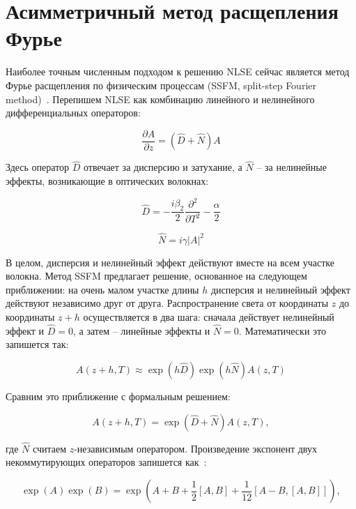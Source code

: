 \section{Асимметричный метод расщепления Фурье}

Наиболее точным численным подходом к решению NLSE сейчас является метод Фурье расщепления по физическим процессам (SSFM, split-step Fourier method)~\cite{ARORA2022169661, agrawal2007nonlinear}.
Перепишем NLSE как комбинацию линейного и нелинейного дифференциальных операторов:

\begin{equation}
	\frac{\partial A}{\partial z} = (\hat{D} + \hat{N}) A
\end{equation}

Здесь оператор $\hat{D}$ отвечает за дисперсию и затухание, а $\hat{N}$ -- за нелинейные эффекты, возникающие в оптических волокнах:

\begin{equation}
	\hat{D} = -\frac{i \beta_2}{2} \frac{\partial^2}{\partial T^2} - \frac{\alpha}{2}
\end{equation}

\begin{equation}
	\hat{N} = i \gamma |A|^2
\end{equation}

В целом, дисперсия и нелинейный эффект действуют вместе на всем участке волокна. Метод SSFM предлагает решение, основанное на следующем приближении: на очень малом участке длины $h$ дисперсия и нелинейный эффект действуют независимо друг от друга.
Распространение света от координаты $z$ до координаты $z+h$ осуществляется в два шага: сначала действует нелинейный эффект и $\hat{D}=0$, а затем -- линейные эффекты и $\hat{N}=0$.
Математически это запишется так:

\begin{equation}
	A(z + h, T) \approx \exp{(h\hat{D})} \exp{(h\hat{N})} A(z, T)
\end{equation}

Сравним это приближение с формальным решением:

\begin{equation}
	A(z + h, T) = \exp{\left( \hat{D} + \hat{N} \right)} A(z, T),
\end{equation}

где $\hat{N}$ считаем $z$-независимым оператором. Произведение экспонент двух некоммутирующих операторов запишется как~\cite{agrawal2007nonlinear}:

\begin{equation}
	\exp{(A)} \exp{(B)} = \exp{\left( A + B + \frac{1}{2}\left[ A, B \right] + \frac{1}{12} \left[ A - B, \left[ A, B \right] \right] \right)},
\end{equation}

